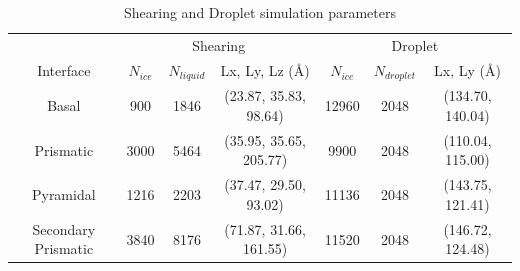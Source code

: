 \documentclass{pnastwo}
\begin{document}
\begin{table}[h]
\centering
\caption{Shearing and Droplet simulation parameters}
\label{tab:method}
\begin{tabular}{|cccc|ccc|} \hline
& \multicolumn{3}{c}{Shearing} & \multicolumn{3}{c}{Droplet}\\
Interface & $N_{ice}$ & $N_{liquid}$ & Lx, Ly, Lz (\AA) &
$N_{ice}$ & $N_{droplet}$ & Lx, Ly (\AA) \\ \hline
Basal & 900 & 1846 & (23.87, 35.83, 98.64) & 12960 & 2048 & (134.70, 140.04)\\
Prismatic & 3000 & 5464 & (35.95, 35.65, 205.77) & 9900 & 2048 &
(110.04, 115.00)\\
Pyramidal & 1216 & 2203& (37.47, 29.50, 93.02) & 11136 & 2048 &
(143.75, 121.41)\\
Secondary Prismatic & 3840 & 8176 & (71.87, 31.66, 161.55) & 11520 &
2048 & (146.72, 124.48)\\
\hline
\end{tabular}
\end{table}
\end{document}

